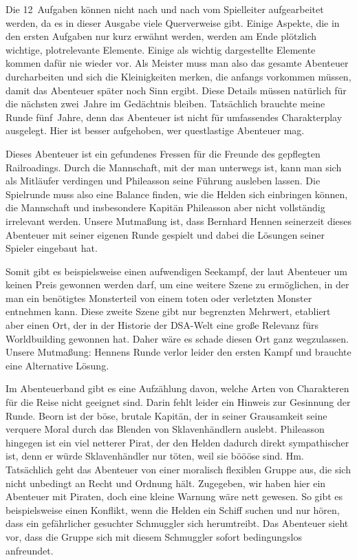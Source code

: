 \documentclass[final]{multiversum}
\begin{document}
Die 12~Aufgaben können nicht nach und nach vom Spielleiter aufgearbeitet werden,
da es in dieser Ausgabe viele Querverweise gibt. Einige Aspekte, die in den
ersten Aufgaben nur kurz erwähnt werden, werden am Ende plötzlich wichtige,
plotrelevante Elemente. Einige als wichtig dargestellte Elemente kommen dafür
nie wieder vor. Als Meister muss man also das gesamte Abenteuer durcharbeiten
und sich die Kleinigkeiten merken, die anfangs vorkommen müssen, damit das
Abenteuer später noch Sinn ergibt. Diese Details müssen natürlich für die
nächsten zwei~Jahre im Gedächtnis bleiben. Tatsächlich brauchte meine Runde
fünf~Jahre, denn das Abenteuer ist nicht für umfassendes Charakterplay
ausgelegt. Hier ist besser aufgehoben, wer questlastige Abenteuer mag.

Dieses Abenteuer ist ein gefundenes Fressen für die Freunde des gepflegten
Railroadings. Durch die Mannschaft, mit der man unterwegs ist, kann man sich als
Mitläufer verdingen und Phileasson seine Führung ausleben lassen. Die Spielrunde
muss also eine Balance finden, wie die Helden sich einbringen können, die
Mannschaft und insbesondere Kapitän Phileasson aber nicht vollständig irrelevant
werden. Unsere Mutmaßung ist, dass Bernhard Hennen seinerzeit dieses
Abenteuer mit seiner eigenen Runde gespielt und dabei die Lösungen seiner
Spieler eingebaut hat.

Somit gibt es beispielsweise einen aufwendigen Seekampf, der laut Abenteuer um
keinen Preis gewonnen werden darf, um eine weitere Szene zu ermöglichen, in der
man ein benötigtes Monsterteil von einem toten oder verletzten Monster entnehmen
kann. Diese zweite Szene gibt nur begrenzten Mehrwert, etabliert aber einen Ort,
der in der Historie der DSA-Welt eine große Relevanz fürs Worldbuilding gewonnen
hat. Daher wäre es schade diesen Ort ganz wegzulassen. Unsere Mutmaßung:
Hennens Runde verlor leider den ersten Kampf und brauchte eine
Alternative Lösung.

Im Abenteuerband gibt es eine Aufzählung davon, welche Arten von Charakteren für
die Reise nicht geeignet sind. Darin fehlt leider ein Hinweis zur Gesinnung der
Runde. Beorn ist der böse, brutale Kapitän, der in seiner Grausamkeit seine
verquere Moral durch das Blenden von Sklavenhändlern auslebt. Phileasson
hingegen ist ein viel netterer Pirat, der den Helden dadurch direkt
sympathischer ist, denn er würde Sklavenhändler nur töten, weil sie böööse sind.
Hm. Tatsächlich geht das Abenteuer von einer moralisch flexiblen Gruppe aus, die
sich nicht unbedingt an Recht und Ordnung hält. Zugegeben, wir haben hier ein
Abenteuer mit Piraten, doch eine kleine Warnung wäre nett gewesen. So gibt es
beispielsweise einen Konflikt, wenn die Helden ein Schiff suchen und nur hören,
dass ein gefährlicher gesuchter Schmuggler sich herumtreibt. Das Abenteuer sieht
vor, dass die Gruppe sich mit diesem Schmuggler sofort bedingungslos anfreundet.
\end{document}
